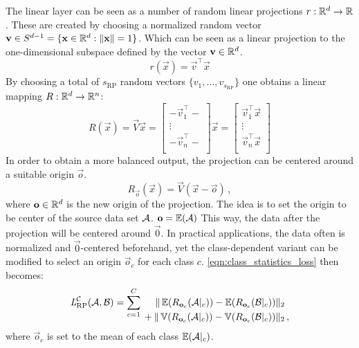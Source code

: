 The linear layer can be seen as a number of random linear projections $r: \mathbb{R}^d \to \mathbb{R}$.
These are created by choosing a normalized random vector $\mathbf v \in S^{d-1} = \{\mathbf x \in \mathbb{R}^d : \|\mathbf x\| = 1\}$.
Which can be seen as a linear projection to the one-dimensional subspace defined by the vector $\mathbf v \in \mathbb{R}^d$.
\[
    r(\vec x) = \vec v ^\top \vec x
\]
By choosing a total of $s_\text{RP}$ random vectors $\{v_1, \dots, v_{s_\text{RP}}\}$ one obtains a linear mapping $R: \mathbb{R}^d \to \mathbb{R}^n$:
\[
    R(\vec x) = \vec V \vec x =
    \begin{bmatrix}
        - \vec v_1 ^\top - \\
        \vdots \\
        - \vec v_n ^\top - \\
    \end{bmatrix}
    \vec x =
    \begin{bmatrix}
        \vec v_1 ^\top \vec x \\
        \vdots \\
        \vec v_n ^\top \vec x \\
    \end{bmatrix}
\]
%
In order to obtain a more balanced output,
the projection can be centered around a suitable origin $\vec o$.
% 
\[
    R_{\vec o} (\vec x) = \vec V (\vec x - \vec o) \,,
\]
where $\mathbf o \in \mathbb{R}^d$ is the new origin of the projection. 
The idea is to set the origin to be center of the source data set $\mathcal A$. $\mathbf o = \operatorname{\mathbb{E}} (\mathcal A)$
This way, the data after the projection will be centered around $\vec 0$.
In practical applications, the data often is normalized and $\vec 0$-centered beforehand,
yet the class-dependent variant can be modified to select an origin $\vec o_c$ for each class $c$.
\cref{eqn:class_statistics_loss} then becomes:
% 
\begin{equation*}
    \textit{L} _{\text{RP}} ^{\mathcal C} (\mathcal A, \mathcal B) =
    \sum _{c = 1}^C
    \begin{alignedat}[t]{1}
        \|\operatorname{\mathbb{E}} ({R_{\mathbf o_c} (\mathcal A|_c)}) - \operatorname{\mathbb{E}} ({R_{\mathbf o_c} (\mathcal B|_c)}) &\|_2 \\
        {} + \|\operatorname{\mathbb{V}} ({R_{\mathbf o_c} (\mathcal A|_c)}) - \operatorname{\mathbb{V}} ({R_{\mathbf o_c} (\mathcal B|_c)}) &\|_2  \,,
    \end{alignedat}
\end{equation*}
%
where $\vec o_c$ is set to the mean of each class $\operatorname{\mathbb{E}} ({\mathcal A|_c})$.


